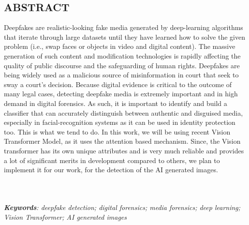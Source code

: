 \begin{center}


    \section*{ABSTRACT}
    \justify
    Deepfakes are realistic-looking fake media generated by deep-learning algorithms that iterate through large datasets until
    they have learned how to solve the given problem (i.e., swap faces or objects in video and digital content). The massive generation
    of such content and modification technologies is rapidly affecting the quality of public discourse and the safeguarding of
    human rights. Deepfakes are being widely used as a malicious source of misinformation in court that seek to sway a court’s decision.
    Because digital evidence is critical to the outcome of many legal cases, detecting deepfake media is extremely important and in high demand in digital forensics.
    As such, it is important to identify and build a classifier that can accurately distinguish between authentic and disguised media, especially in facial-recognition systems
    as it can be used in identity protection too. This is what we tend to do. In this work,
    we will be using recent Vision Transformer Model, as it uses the attention based mechanism. Since, the Vision transformer has its own unique attributes and is very much reliable and provides a lot of significant merits in development compared to others, we plan to implement it for our work, for the detection of the AI generated images.\\
    \\
    \\
    \\ \textit{\textbf{Keywords}: deepfake detection; digital forensics; media forensics; deep learning; Vision Transformer; AI generated images}


\end{center}
